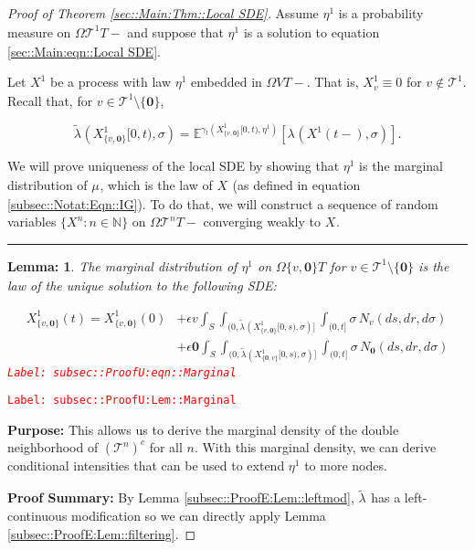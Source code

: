 \documentclass[12pt]{article}
\newcommand{\mb}{\mathbb}
\newcommand{\mc}{\mathcal}
\newcommand{\ep}{\epsilon}
\newcommand{\tr}{\textcolor{red}}
\newcommand{\labe}[1]{\tr{\texttt{Label: #1}}}
\newcommand{\purpose}{\textbf{Purpose: }}
\newcommand{\pfsum}{\textbf{Proof Summary: }}
\newcommand{\ind}{\hspace{24pt}}
\newcommand{\lin}{\rule{\linewidth}{0.4 pt}}
\newcommand{\exmu}[2]{\mb{E}^{#1}\left[#2\right]}	%
\renewcommand{\root}{\mathbf{0}}				%
\renewcommand{\v}{v}							%
\renewcommand{\S}{S}							%
\newcommand{\s}{\sigma}							%
\newcommand{\ev}{\ep}							%
\newcommand{\T}{T}								%
\renewcommand{\t}{t}							%
\newcommand{\poiss}[1]{N_{#1}}						%
\newcommand{\pup}[1]{^{#1}}							%
\newcommand{\tree}{\mc{T}}							%
\newcommand{\V}{V}									%
\renewcommand{\tt}{s}								%
\renewcommand{\r}{r}								%
\newcommand{\numb}{n}								%
\newcommand{\rxvtn}[3]{X_{#1}^{#3}(#2)}				%
\newcommand{\rxvts}[2]{X_{#1}{#2}}					%
\newcommand{\rxvtsn}[3]{X_{#1}^{#3}{#2}}			%
\newcommand{\m}[3]{\mu_{#2#1}^{#3}}						%
\newcommand{\mmm}[3]{\eta_{#2#1}^{#3}}						%
\newcommand{\cm}{\gamma}							%
\newcommand{\rate}[1]{\lambda_{#1}}					%
\newcommand{\crate}[2]{\alt{\lambda}_{#1}^{#2}}		%
\newcommand{\alt}{\widetilde}						%
\newtheorem{lem}[thms]{Lemma: }
\begin{document}
\begin{proof}[Proof of Theorem \ref{sec::Main:Thm::Local SDE}]

Assume \(\mmm{}{}{1}\) is a probability measure on \(\Omega{\tree\pup{1}}{\T-}\) and suppose that \(\mmm{}{}{1}\) is a solution to equation \eqref{sec::Main:eqn::Local SDE}.

\ind Let \(\rxvtsn{}{}{1}\) be a process with law \(\mmm{}{}{1}\) embedded in \(\Omega{\V}{\T-}\). That is, \(\rxvtsn{\v}{}{1} \equiv 0\) for \(\v \notin \tree\pup{1}\). Recall that, for \(\v \in \tree\pup{1}\setminus\{\root\}\),

\[\crate{}{}(\rxvtsn{\{\v,\root\}}{[0,\t)}{1},\s) = \exmu{\cm_\t(\rxvtsn{\{\v,\root\}}{[0,\t)}{1},\mmm{}{}{1})}{\rate{}(\rxvtn{}{\t-}{1},\s)}.\]

\ind We will prove uniqueness of the local SDE by showing that \(\mmm{}{}{1}\) is the marginal distribution of \(\m{}{}{}\), which is the law of \(\rxvts{}{}\) (as defined in equation \eqref{subsec::Notat:Eqn::IG}). To do that, we will construct a sequence of random variables \(\{\rxvtsn{}{}{\numb}:\numb\in\mb{N}\}\) on \(\Omega{\tree\pup{\numb}}{\T-}\) converging weakly to \(\rxvts{}{}\). 

\lin

\begin{lem}
The marginal distribution of \(\mmm{}{}{1}\) on \(\Omega{\{\v,\root\}}{\T}\) for \(\v \in \tree\pup{1}\setminus\{\root\}\) is the law of the unique solution to the following SDE:

\begin{align}
\rxvtn{\{\v,\root\}}{\t}{1} = \rxvtn{\{\v,\root\}}{0}{1} &+ \ev{\v}\int_\S\int_{(0,\crate{}{}(\rxvtsn{\{\v,\root\}}{[0,\tt)}{1},\s)]}\int_{(0,t]}\s\,\poiss{\v}(d\tt,d\r,d\s)\nonumber\\
&+ \ev{\root}\int_\S\int_{(0,\crate{}{}(\rxvtsn{\{\root,\v\}}{[0,\tt)}{1},\s)]}\int_{(0,t]}\s\,\poiss{\root}(d\tt,d\r,d\s)
\label{subsec::ProofU:eqn::Marginal}
\end{align}
\labe{subsec::ProofU:eqn::Marginal}
\label{subsec::ProofU:Lem::Marginal}
\end{lem}
\labe{subsec::ProofU:Lem::Marginal}

\purpose This allows us to derive the marginal density of the double neighborhood of \((\tree\pup{n})^c\) for all \(\numb\). With this marginal density, we can derive conditional intensities that can be used to extend \(\mmm{}{}{1}\) to more nodes.

\pfsum By Lemma \ref{subsec::ProofE:Lem::leftmod}, \(\crate{}{}\) has a left-continuous modification so we can directly apply Lemma \ref{subsec::ProofE:Lem::filtering}.


\end{proof}
\end{document}
